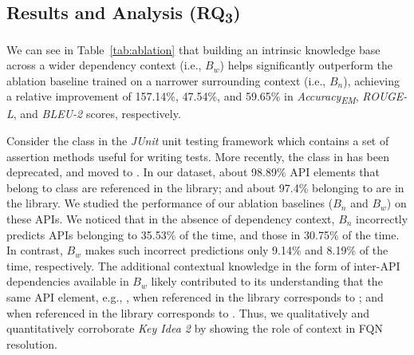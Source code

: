 \subsection*{Results and Analysis (RQ\textsubscript{3})}
\label{sec:rq2}



We can see in Table~\ref{tab:ablation} that building an intrinsic knowledge base across a wider dependency context (i.e., $B_w$) helps \tool significantly outperform the ablation baseline trained on a narrower surrounding context (i.e., $B_n$), achieving a relative improvement of 157.14\%, 47.54\%, and 59.65\% in \textit{Accuracy\textsubscript{EM}}, \textit{ROUGE-L}, and \textit{BLEU-2} scores, respectively. 

Consider the  class in the \textit{JUnit} unit testing framework which contains a set of assertion methods useful for writing tests. More recently, the  class in  has been deprecated, and moved to . In our dataset, about 98.89\% API elements that belong to  class are referenced in the  library; and about 97.4\% belonging to  are in the  library. We studied the performance of our ablation baselines ($B_n$ and $B_w$) on these APIs. We noticed that in the absence of dependency context, $B_n$ incorrectly predicts APIs belonging to  35.53\% of the time, and those in  30.75\% of the time. In contrast, $B_w$ makes such incorrect predictions only 9.14\% and 8.19\% of the time, respectively. The additional contextual knowledge in the form of inter-API dependencies available in $B_w$ likely contributed to its understanding that the same API element, e.g., , when referenced in the  library corresponds to ; and when referenced in the  library corresponds to . Thus, we qualitatively and quantitatively corroborate \textit{Key Idea 2} by showing the role of context in FQN resolution.





